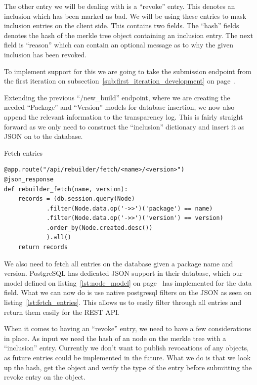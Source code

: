 \documentclass[../Main/thesis.tex]{subfiles}
\begin{document}
The other entry we will be dealing with is a ``revoke'' entry. This denotes an
inclusion which has been marked as bad. We will be using these entries to mask
inclusion entries on the client side. This contains two fields. The ``hash''
fields denotes the hash of the merkle tree object containing an inclusion entry.
The next field is ``reason'' which can contain an optional message as to why the
given inclusion has been revoked.

To implement support for this we are going to take the submission endpoint from
the first iteration on subsection~\ref{sub:first_iteration_development} on
page~\pageref{sub:first_iteration_development}.

Extending the previous ``/new\_build'' endpoint, where we are creating the
needed ``Package'' and ``Version'' models for database insertion, we now also
append the relevant information to the transparency log. This is fairly straight
forward as we only need to construct the ``inclusion'' dictionary and insert it
as JSON on to the database.

\begin{listing}[H]
\caption{Fetch entries}
\label{lst:fetch_entries}
\begin{verbatim}
@app.route("/api/rebuilder/fetch/<name>/<version>")
@json_response
def rebuilder_fetch(name, version):
    records = (db.session.query(Node)
            .filter(Node.data.op('->>')('package') == name)
            .filter(Node.data.op('->>')('version') == version)
            .order_by(Node.created.desc())
            ).all()
    return records
\end{verbatim}
\end{listing}

We also need to fetch all entries on the database given a package name and
version. PostgreSQL has dedicated JSON support in their database, which our
model defined on listing~\ref{lst:node_model} on page~\pageref{lst:node_model}
has implemented for the data field. What we can now do is use native postgresql
filters on the JSON as seen on listing~\ref{lst:fetch_entries}. This allows us
to easily filter through all entries and return them easily for the REST API.

When it comes to having an ``revoke'' entry, we need to have a few
considerations in place. As input we need the hash of an node on the merkle
tree with a ``inclusion'' entry. Currently we don't want to publish revocations
of any objects, as future entries could be implemented in the future. What we do
is that we look up the hash, get the object and verify the type of the entry
before submitting the revoke entry on the object.
\end{document}
